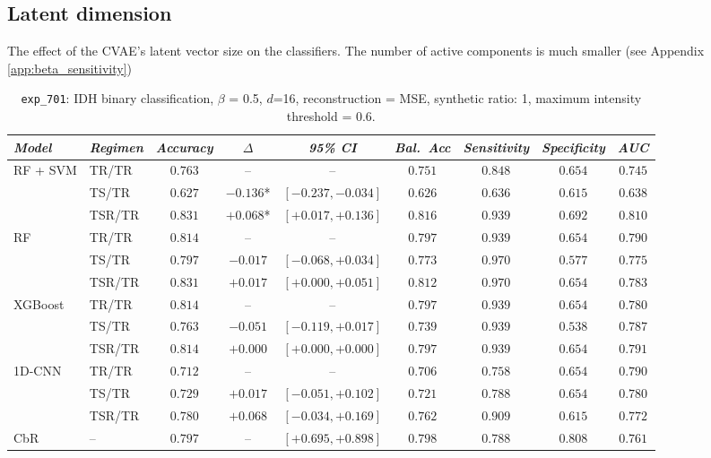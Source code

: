 \subsection*{Latent dimension}
The effect of the CVAE's latent vector size on the classifiers. The number of active components is much smaller (see Appendix \ref{app:beta_sensitivity})
\begin{table}[H]
\centering
\scriptsize

\label{tab:ctrl_exp_701}
\begin{tabular*}{\textwidth}{@{\extracolsep{\fill}}llccccccc}
\toprule
\emph{Model} & \emph{Regimen} & \emph{Accuracy} & \emph{$\Delta$} & \emph{95\% CI} & \emph{Bal.\ Acc} & \emph{Sensitivity} & \emph{Specificity} & \emph{AUC}\\
\midrule
\multirow{3}{*}{RF + SVM} & TR/TR & $0.763$ & -- & -- & $0.751$ & $0.848$ & $0.654$ & $0.745$\\
 & TS/TR & $0.627$ & $-0.136$* & $[-0.237, -0.034]$ & $0.626$ & $0.636$ & $0.615$ & $0.638$\\
 & TSR/TR & $0.831$ & $+0.068$* & $[+0.017, +0.136]$ & $0.816$ & $0.939$ & $0.692$ & $0.810$\\
\midrule
\multirow{3}{*}{RF} & TR/TR & $0.814$ & -- & -- & $0.797$ & $0.939$ & $0.654$ & $0.790$\\
 & TS/TR & $0.797$ & $-0.017$ & $[-0.068, +0.034]$ & $0.773$ & $0.970$ & $0.577$ & $0.775$\\
 & TSR/TR & $0.831$ & $+0.017$ & $[+0.000, +0.051]$ & $0.812$ & $0.970$ & $0.654$ & $0.783$\\
\midrule
\multirow{3}{*}{XGBoost} & TR/TR & $0.814$ & -- & -- & $0.797$ & $0.939$ & $0.654$ & $0.780$\\
 & TS/TR & $0.763$ & $-0.051$ & $[-0.119, +0.017]$ & $0.739$ & $0.939$ & $0.538$ & $0.787$\\
 & TSR/TR & $0.814$ & $+0.000$ & $[+0.000, +0.000]$ & $0.797$ & $0.939$ & $0.654$ & $0.791$\\
\midrule
\multirow{3}{*}{1D-CNN} & TR/TR & $0.712$ & -- & -- & $0.706$ & $0.758$ & $0.654$ & $0.790$\\
 & TS/TR & $0.729$ & $+0.017$ & $[-0.051, +0.102]$ & $0.721$ & $0.788$ & $0.654$ & $0.780$\\
 & TSR/TR & $0.780$ & $+0.068$ & $[-0.034, +0.169]$ & $0.762$ & $0.909$ & $0.615$ & $0.772$\\
\midrule
CbR & -- & $0.797$ & -- & $[+0.695, +0.898]$ & $0.798$ & $0.788$ & $0.808$ & $0.761$\\
\bottomrule
\end{tabular*}
\caption{\small \texttt{exp\_701}: IDH binary classification, $\beta$ = 0.5, $d$=16, reconstruction = MSE, synthetic ratio: 1, maximum intensity threshold = 0.6.}
\end{table}

